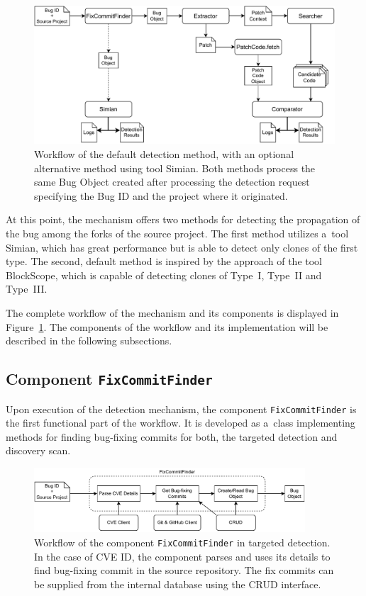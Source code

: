   \begin{figure}[h]
    \centering
    \includegraphics[width=1\textwidth]{obrazky-figures/cg_impl_detection.drawio.pdf}
    \caption{Workflow of the default detection method, with an optional alternative method using tool Simian. Both
             methods process the same Bug Object created after processing the detection request
             specifying the Bug ID and the project where it originated.}
    \label{cg-impl-detection}  %
  \end{figure}

  At this point, the mechanism offers two methods for detecting the propagation of the bug among the forks of the source project.
  The first method utilizes a~tool Simian, which has great performance but is able to detect only clones of the first type.
  The second, default method is inspired by the approach of the tool BlockScope, which is capable of detecting clones of Type~I,
  Type~II and Type~III.

  The complete workflow of the mechanism and its components is displayed in Figure~\ref{cg-impl-detection}. The components
  of the workflow and its implementation will be described in the following subsections.

  \subsection*{Component \texttt{FixCommitFinder}}
  Upon execution of the detection mechanism, the component \texttt{FixCommitFinder} is the first functional part of the workflow.
  It is developed as a~class implementing methods for finding bug-fixing commits for both, the targeted detection
  and discovery scan.

  \begin{figure}[h]
    \centering
    \includegraphics[width=0.9\textwidth]{obrazky-figures/cg_impl_fixcommitfinder.drawio.pdf}
    \caption{Workflow of the component \texttt{FixCommitFinder} in targeted detection. In the case of CVE ID, the component
             parses and uses its details to find bug-fixing commit in the source repository. The fix commits can be supplied
             from the internal database using the CRUD interface.}
    \label{cg-impl-fixcommitfinder}
  \end{figure}

